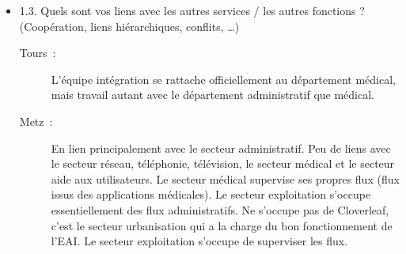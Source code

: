 \begin{itemize}
\begin{description}
\begin{figure}[H]
		\end{figure}
	  \end{description}
	  
	  \item 1.3. Quels sont vos liens avec les autres services / les autres
	  fonctions ? (Coopération, liens hiérarchiques, conflits, …)
	  \begin{description}
	  	\item[Tours~:] L’équipe intégration se rattache officiellement au
	  	département médical, mais travail autant avec le département administratif
	  	que médical.
	  	\item[Metz~:] En lien principalement avec le secteur administratif. Peu de
	  	liens avec le secteur réseau, téléphonie, télévision, le secteur médical et
	  	le secteur aide aux utilisateurs. Le secteur médical supervise ses propres
	  	flux (flux issus des applications médicales). Le secteur exploitation
	  	s’occupe essentiellement des flux administratifs. Ne s’occupe pas de
	  	Cloverleaf, c’est le secteur urbanisation qui a la charge du bon
	  	fonctionnement de l’EAI. Le secteur exploitation s’occupe de superviser les
	  	flux.
	  \end{description}
	\end{itemize}
	
